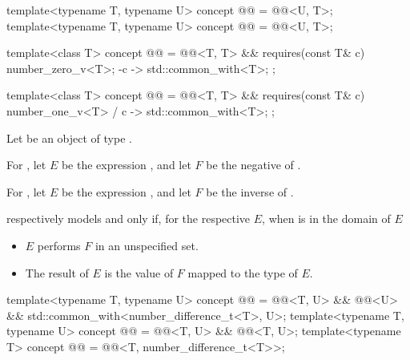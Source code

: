 \begin{itemdecl}
template<typename T, typename U>
concept @@ = @@<U, T>;
template<typename T, typename U>
concept @@ = @@<U, T>;
\end{itemdecl}

\begin{itemdecl}
template<class T> concept @@ =
  @@<T, T> &&
  requires(const T& c) {
    number_zero_v<T>;
    { -c } -> std::common_with<T>;
  };

template<class T> concept @@ =
  @@<T, T> &&
  requires(const T& c) {
    { number_one_v<T> / c } -> std::common_with<T>;
  };
\end{itemdecl}

\begin{itemdescr}
\pnum
Let  be an object of type .

\pnum
For ,
let $E$ be the expression , and
let $F$ be the negative of .

\pnum
For ,
let $E$ be the expression , and
let $F$ be the inverse of .

\pnum
{} respectively models
 and
only if, for the respective $E$, when  is in the domain of $E$
\begin{itemize}
\item
$E$ performs $F$ in an unspecified set.
\item
The result of $E$ is the value of $F$ mapped to the type of $E$.
\end{itemize}
\end{itemdescr}

\begin{itemdecl}
template<typename T, typename U>
concept @@ =
  @@<T, U> && @@<U> && std::common_with<number_difference_t<T>, U>;
template<typename T, typename U>
concept @@ = @@<T, U> && @@<T, U>;
template<typename T>
concept @@ = @@<T, number_difference_t<T>>;
\end{itemdecl}

